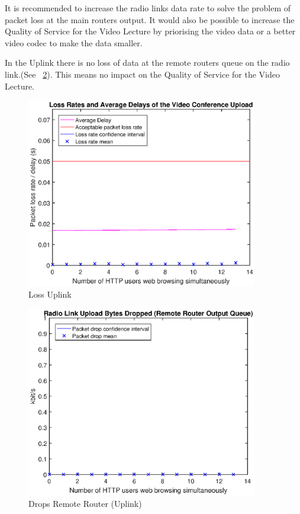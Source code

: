 \documentclass[a4paper,10pt]{book}\usepackage{graphicx}
\begin{document}
It is recommended to increase the radio links data rate to solve the problem of packet loss at the main routers output. It would also be possible to increase the Quality of Service for the Video Lecture 
by priorising the video data or a better video codec to make the data smaller.

In the Uplink there is no loss of data at the remote routers queue on the radio link.(See ~\ref{fig:remoteRdrops}).
This means no impact on the Quality of Service for the Video Lecture.
\begin{figure}[!ht]
  \begin{center}
  \includegraphics[width=0.9\textwidth]{off_loss_conf_upload.eps}
    \caption{Loss Uplink}
     \label{fig:losslecup}
     \end{center}
\end{figure}

\begin{figure}[!ht]
  \begin{center}
    \includegraphics[width=0.9\textwidth]{on_remote_router_drops.eps}
    \caption{Drops Remote Router (Uplink)}
     \label{fig:remoteRdrops}
     \end{center}
\end{figure}
\end{document}
